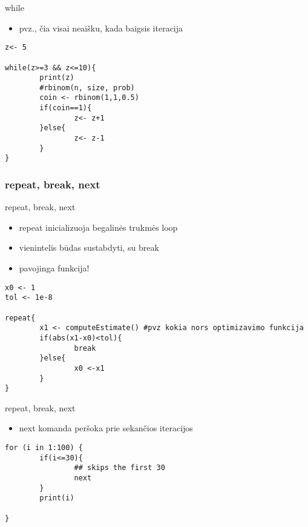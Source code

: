 \documentclass[11pt,xcolor=table]{beamer}
\begin{document}
\begin{frame}[fragile]{while}
\begin{itemize}
\item pvz., čia visai neaišku, kada baigsis iteracija
\end{itemize}
\begin{lstlisting}
z<- 5

while(z>=3 && z<=10){
        print(z)
        #rbinom(n, size, prob)
        coin <- rbinom(1,1,0.5)
        if(coin==1){
                z<- z+1
        }else{
                z<- z-1
        }
}

\end{lstlisting}
\end{frame}

\subsubsection{repeat, break, next}
\begin{frame}[fragile]{repeat, break, next}
\begin{itemize}
\item repeat inicializuoja begalinės trukmės loop
\item vienintelis būdas sustabdyti, su break
\item pavojinga funkcija!
\end{itemize}
\begin{lstlisting}
x0 <- 1
tol <- 1e-8

repeat{
        x1 <- computeEstimate() #pvz kokia nors optimizavimo funkcija
        if(abs(x1-x0)<tol){
                break
        }else{
                x0 <-x1
        }
}
\end{lstlisting}
\end{frame}


\begin{frame}[fragile]{repeat, break, next}
\begin{itemize}
\item next komanda peršoka prie sekančios iteracijos
\end{itemize}
\begin{lstlisting}
for (i in 1:100) {
        if(i<=30){
                ## skips the first 30
                next
        }
        print(i)
        
}
\end{lstlisting}
\end{frame}
\end{document}
